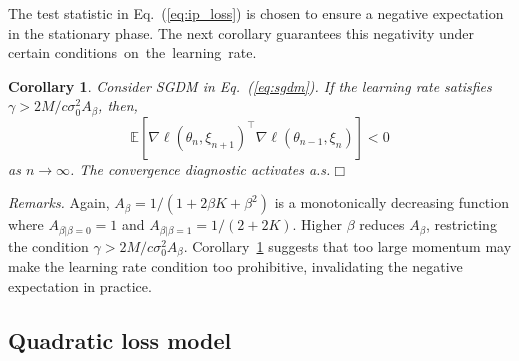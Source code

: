 \documentclass[conference]{IEEEtran}
\newtheorem{corollary}[theorem]{Corollary}
\begin{document}
The test statistic in Eq.~(\ref{eq:ip_loss}) is chosen to ensure a negative expectation in the stationary phase. 
The next corollary guarantees this negativity under certain conditions~on~the~learning~rate.
\begin{corollary}
\label{cor:ip_exp_neg}
Consider SGDM in Eq.~(\ref{eq:sgdm}). If
the learning rate satisfies $\gamma > 2 M / c \sigma_0^2 A_\beta$, then, 
\begin{equation*}
\mathbb{E} [ \nabla \ell ( \theta_n, \xi_{n+1} )^\top \nabla \ell ( \theta_{n-1}, \xi_n ) ] 
< 0
\end{equation*}
as $n \rightarrow \infty$.
The convergence diagnostic activates a.s.\hfill$\Box$
\end{corollary}
\emph{Remarks.}
Again, $A_\beta =  1 / (1 + 2 \beta K + \beta^2)$ is a monotonically decreasing function where $A_{\beta | \beta=0} = 1$ and $A_{\beta | \beta=1} = 1 / (2 + 2K)$.
Higher $\beta$ reduces $A_\beta$, restricting the condition $\gamma > 2M / c \sigma_0^2 A_\beta$.
Corollary~\ref{cor:ip_exp_neg} suggests that too large momentum may make the learning rate condition too prohibitive, invalidating the negative expectation in practice.


\subsection{Quadratic loss model}\label{sec:quadratic}
\end{document}
